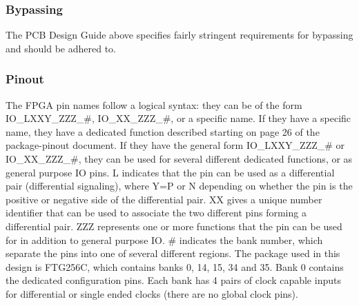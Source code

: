 \subsubsection{Bypassing}
\label{sec:xc7a15t-ftg256-bypassing}

The PCB Design Guide above specifies fairly stringent requirements for bypassing and should be
adhered to.

\subsubsection{Pinout}
\label{sec:xc7a15t-ftg256-pinout}

The FPGA pin names follow a logical syntax: they can be of the form IO\_LXXY\_ZZZ\_\#,
IO\_XX\_ZZZ\_\#, or a specific name. If they have a specific name, they have a dedicated function
described starting on page 26 of the package-pinout document. If they have the general form
IO\_LXXY\_ZZZ\_\# or IO\_XX\_ZZZ\_\#, they can be used for several different dedicated functions, or
as general purpose IO pins. L indicates that the pin can be used as a differential pair
(differential signaling), where Y=P or N depending on whether the pin is the positive or negative
side of the differential pair. XX gives a unique number identifier that can be used to associate the
two different pins forming a differential pair. ZZZ represents one or more functions that the pin
can be used for in addition to general purpose IO. \# indicates the bank number, which separate the
pins into one of several different regions. The package used in this design is FTG256C, which
contains banks 0, 14, 15, 34 and 35. Bank 0 contains the dedicated configuration pins. Each bank has
4 pairs of clock capable inputs for differential or single ended clocks (there are no global clock
pins).


